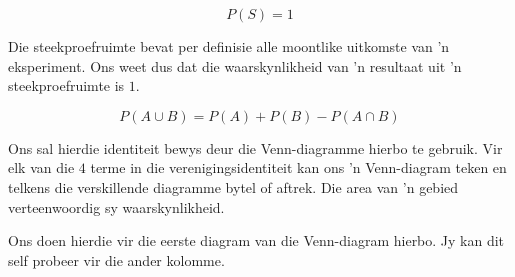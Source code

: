   \[P(S)=1\]


Die steekproefruimte bevat per definisie alle moontlike uitkomste van 'n eksperiment. Ons weet dus dat die waarskynlikheid van 'n resultaat uit 'n steekproefruimte is $1$.


  \[P(A \cup B) = P(A) + P(B) - P(A \cap B)\]


Ons sal hierdie identiteit bewys deur die Venn-diagramme hierbo te gebruik. Vir elk van die $4$ terme in die verenigingsidentiteit kan ons 'n Venn-diagram teken en telkens die verskillende diagramme bytel of aftrek. Die area van 'n gebied verteenwoordig sy waarskynlikheid.\par

Ons doen hierdie vir die eerste diagram van die Venn-diagram hierbo. Jy kan dit self probeer vir die ander kolomme.

